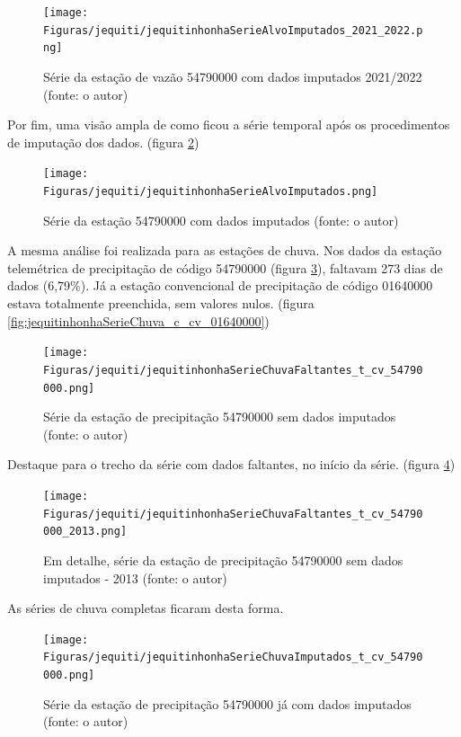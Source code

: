 \begin{figure}[!h]
\centering
\texttt{[image: Figuras/jequiti/jequitinhonhaSerieAlvoImputados\_2021\_2022.png]}
\caption{Série da estação de vazão 54790000 com dados imputados 2021/2022 (fonte: o autor)}
\label{fig:jequitinhonhaSerieAlvoImputados_2021_2022}
\end{figure}

\newpage
Por fim, uma visão ampla de como ficou a série temporal após os procedimentos de imputação dos dados. (figura \ref{fig:jequitinhonhaSerieAlvoImputados})

\begin{figure}[!h]
\centering
\texttt{[image: Figuras/jequiti/jequitinhonhaSerieAlvoImputados.png]}
\caption{Série da estação 54790000 com dados imputados (fonte: o autor)}
\label{fig:jequitinhonhaSerieAlvoImputados}
\end{figure}

A mesma análise foi realizada para as estações de chuva. Nos dados da estação telemétrica de precipitação de código 54790000 (figura \ref{fig:jequitinhonhaSerieChuvaFaltantes_t_cv_54790000}), faltavam 273 dias de dados (6,79\%). Já a estação convencional de precipitação de código 01640000 estava totalmente preenchida, sem valores nulos. (figura \ref{fig:jequitinhonhaSerieChuva_c_cv_01640000})

\begin{figure}[!h]
\centering
\texttt{[image: Figuras/jequiti/jequitinhonhaSerieChuvaFaltantes\_t\_cv\_54790000.png]}
\caption{Série da estação de precipitação 54790000 sem dados imputados (fonte: o autor)}
\label{fig:jequitinhonhaSerieChuvaFaltantes_t_cv_54790000}
\end{figure}

Destaque para o trecho da série com dados faltantes, no início da série. (figura \ref{fig:jequitinhonhaSerieChuvaFaltantes_t_cv_54790000_2013})

\begin{figure}[!h]
\centering
\texttt{[image: Figuras/jequiti/jequitinhonhaSerieChuvaFaltantes\_t\_cv\_54790000\_2013.png]}
\caption{Em detalhe, série da estação de precipitação 54790000 sem dados imputados - 2013 (fonte: o autor)}
\label{fig:jequitinhonhaSerieChuvaFaltantes_t_cv_54790000_2013}
\end{figure}

As séries de chuva completas ficaram desta forma. \pagebreak

\begin{figure}[!h]
\centering
\texttt{[image: Figuras/jequiti/jequitinhonhaSerieChuvaImputados\_t\_cv\_54790000.png]}
\caption{Série da estação de precipitação 54790000 já com dados imputados (fonte: o autor)}
\label{fig:jequitinhonhaSerieChuvaImputados_t_cv_54790000}
\end{figure}

